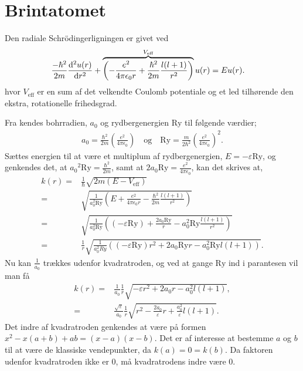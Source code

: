 \section{Brintatomet}
Den radiale Schrödingerligningen er givet ved \cite[s. 140]{griffiths}
%
\begin{align}
    \frac{-\hbar^{2}}{2m}\diff[2]{u(r)}{r} + \overbrace{\left( - \frac{e^{2}}{4\pi\epsilon_{0}r} + \frac{\hbar^{2}}{2m}\frac{l(l+1)}{r^{2}} \right)}^{V_{\text{eff}}} u(r) & \nonumber = Eu(r).
\end{align}
%
hvor $V_{\text{eff}}$ er en sum af det velkendte Coulomb potentiale og et led tilhørende den ekstra, rotationelle frihedsgrad.

Fra \cite{griffiths} kendes bohrradien, $a_{0}$ og rydbergenergien $\mathrm{Ry}$ til følgende værdier;
\begin{align}
    a_{0} = \frac{\hbar^{2}}{2m} {\left(\frac{e^{2}}{4\pi\epsilon_{0}} \right) \quad \text{og} \quad \mathrm{Ry} = \frac{m}{2\hbar^{2}}\left(\frac{e^{2}}{4\pi\epsilon_0} \right)}^{2}.
    \label{eq:konstanter}
\end{align}
%
Sættes energien til at være et multiplum af rydbergenergien, $E=-\varepsilon \mathrm{Ry}$, og genkendes det, at ${a_{0}}^{2}\mathrm{Ry} = \frac{\hbar^{2}}{2m}$, samt at $2a_{0}\mathrm{Ry} = \frac{e^{2}}{4\pi\epsilon_{0}}$, kan det skrives at,
\begin{align}
    k(r) = & \frac{1}{\hbar} \sqrt{2m\left( E - V_{\text{eff}} \right)}\\
    = & \sqrt{\frac{1}{a_{0}^{2}\mathrm{\mathrm{Ry}}} \left( E + \frac{e^{2}}{4\pi\epsilon_{0}r} - \frac{\hbar^{2}}{2m}\frac{l(l+1)}{r^{2}} \right)}\\
    = & \sqrt{\frac{1}{a_{0}^{2}\mathrm{Ry}} \left( (-\varepsilon \mathrm{Ry}) + \frac{2a_{0}\mathrm{Ry}}{r} - a_{0}^{2}\mathrm{Ry}\frac{l(l+1)}{r^{2}} \right)}\\
    = & \frac{1}{r} \sqrt{\frac{1}{a_{0}^{2}{Ry}} \left( (-\varepsilon \mathrm{Ry})r^{2} + 2a_{0}\mathrm{Ry} r - a_{0}^{2}\mathrm{Ry} l(l+1) \right)}.
\end{align}
Nu kan $\frac{1}{a_0}$ trækkes udenfor kvadratroden, og ved at gange $\mathrm{Ry}$ ind i parantesen vil man få
\begin{align}
    k(r) = & \frac{1}{a_0} \frac{1}{r} \sqrt{-\varepsilon r^2 + 2a_0r - a_0^2l(l+1)}, \\
    = & \frac{\sqrt{\varepsilon}}{a_0} \frac{1}{r} \sqrt{r^2 - \frac{2a_0}{\varepsilon}r + \frac{a_0^2}{\varepsilon}l(l+1)}.
\end{align}
Det indre af kvadratroden genkendes at være på formen $x^2 -x(a+b) + ab = (x-a)(x-b)$. Det er af interesse at bestemme $a$ og $b$ til at være de klassiske vendepunkter, da $k(a) = 0 = k(b)$. Da faktoren udenfor kvadratroden ikke er $0$, må kvadratrodens indre være $0$.

